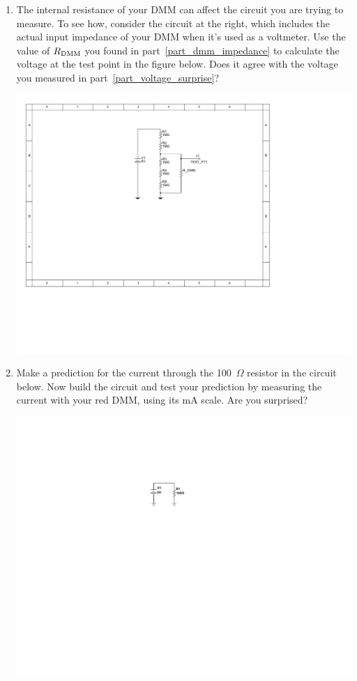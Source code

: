 \begin{enumerate}[wide]
\item The internal resistance of your DMM can affect the circuit you are trying to measure.  To see how, consider the circuit at the right, which includes the actual input impedance of your DMM when it's used as a voltmeter.  Use the value of $R_{\rm DMM}$ you found in part~\ref{part_dmm_impedance} to calculate the voltage at the test point in the figure below.  Does it agree with the voltage you measured in part~\ref{part_voltage_surprise}?

\begin{center}
\includegraphics{input_output_impedance/input_impedance2.pdf}
\end{center}

\item Make a prediction for the current through the 100~$\Omega$ resistor in the circuit below.  Now build the circuit and test your prediction by measuring the current with your red DMM, using its mA scale.  Are you surprised? \label{part_current_surprise}
 
\begin{center}
\includegraphics{input_output_impedance/current_measurement.pdf}
\end{center}


\end{enumerate}
